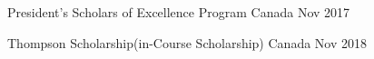 


\begin{cvhonors}

  \cvhonor
    {}
    {President’s Scholars of Excellence Program} %
    {Canada} %
    {Nov 2017} %

  \cvhonor
    {}
    {Thompson Scholarship(in-Course Scholarship)} %
    {Canada} %
    {Nov 2018} %
\end{cvhonors}
